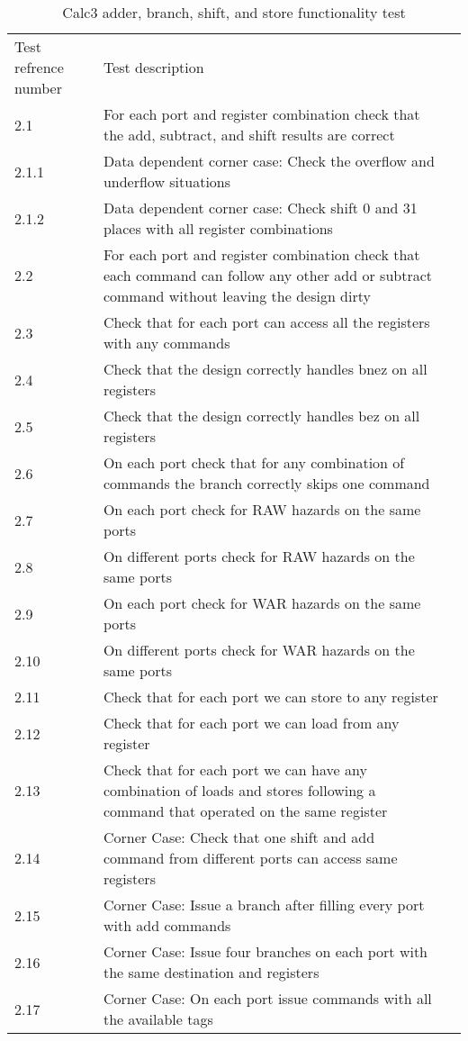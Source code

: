 \documentclass[a4paper, 11pt]{article}
\begin{document}
\begin{table}[H]
    \centering
    \begin{tabular}{lp{12cm}l}
        \toprule
        Test refrence number& Test description\\
        \cmidrule(r){1-1}\cmidrule(lr){2-2}
        2.1 & For each port and register combination check that the add, subtract,
        and shift results are correct\\
        2.1.1 & Data dependent corner case: Check the overflow and 
        underflow situations \\
        2.1.2 & Data dependent corner case: Check shift 0 and 31 places 
        with all register combinations \\
        2.2 & For each port and register combination check that each command
        can follow any other add or subtract command without 
        leaving the design dirty\\
        2.3 & Check that for each port can access all the registers with any
        commands \\
        2.4 & Check that the design correctly handles bnez on all registers \\
        2.5 & Check that the design correctly handles bez on all registers \\
        2.6 & On each port check that for any combination of commands
        the branch correctly skips one command \\
        2.7 & On each port check for RAW hazards on the same ports \\
        2.8 & On different ports check for RAW hazards on the same ports \\
        2.9 & On each port check for WAR hazards on the same ports \\
        2.10 & On different ports check for WAR hazards on the same ports \\
        2.11 & Check that for each port we can store to any register \\
        2.12 & Check that for each port we can load from any register \\
        2.13 & Check that for each port we can have any combination of loads
        and stores following a command that operated on the same register\\
        2.14 & Corner Case: Check that one shift and add command from different
        ports can access same registers \\
        2.15 & Corner Case: Issue a branch after filling every port with
        add commands \\
        2.16 & Corner Case: Issue four branches on each port with the same
        destination and registers\\
        2.17 & Corner Case: On each port issue commands with all the
        available tags \\
        \bottomrule
    \end{tabular}
    \caption{Calc3 adder, branch, shift, and store functionality test}
    \label{table:4}
\end{table}
\end{document}
